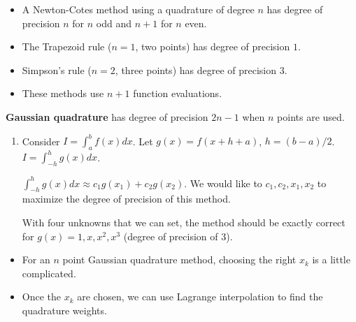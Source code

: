\documentclass[12pt,letterpaper,noanswers]{exam}
\begin{document}
\begin{tcolorbox}

\begin{itemize}
\itemsep0pt
    \item A Newton-Cotes method using a quadrature of degree $n$ has degree of precision $n$ for $n$ odd and $n+1$ for $n$ even.
    \item The Trapezoid rule ($n = 1$, two points) has degree of precision $1$.
    \item Simpson's rule ($n=2$, three points) has degree of precision $3$.
    \item These methods use $n+1$ function evaluations.
\end{itemize}
\textbf{Gaussian quadrature} has degree of precision $2n-1$ when $n$ points are used.
\end{tcolorbox}
\begin{enumerate}[resume=classQ]
    \item Consider $I = \int_a^b f(x)dx$.  Let $g(x) = f(x+h+a)$, $h = (b-a)/2$.  $I = \int_{-h}^h g(x) dx$.
    
        $\int_{-h}^h g(x) dx \approx c_1 g(x_1) + c_2 g(x_2)$.  We would like to $c_1, c_2, x_1, x_2$ to maximize the degree of precision of this method.  
        
        With four unknowns that we can set, the method should be exactly correct for $g(x) = 1, x, x^2, x^3$ (degree of precision of $3$).
\end{enumerate}


\begin{tcolorbox}
\begin{itemize}
\itemsep0pt
    \item For an $n$ point Gaussian quadrature method, choosing the right $x_k$ is a little complicated.
    \item Once the $x_k$ are chosen, we can use Lagrange interpolation to find the quadrature weights.  %
\end{itemize}

\end{tcolorbox}
\end{document}
